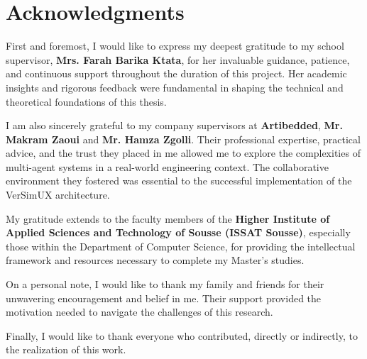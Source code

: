 \chapter*{Acknowledgments}
\thispagestyle{plain}

First and foremost, I would like to express my deepest gratitude to my school supervisor, \textbf{Mrs. Farah Barika Ktata}, for her invaluable guidance, patience, and continuous support throughout the duration of this project. Her academic insights and rigorous feedback were fundamental in shaping the technical and theoretical foundations of this thesis.

I am also sincerely grateful to my company supervisors at \textbf{Artibedded}, \textbf{Mr. Makram Zaoui} and \textbf{Mr. Hamza Zgolli}. Their professional expertise, practical advice, and the trust they placed in me allowed me to explore the complexities of multi-agent systems in a real-world engineering context. The collaborative environment they fostered was essential to the successful implementation of the VerSimUX architecture.

My gratitude extends to the faculty members of the \textbf{Higher Institute of Applied Sciences and Technology of Sousse (ISSAT Sousse)}, especially those within the Department of Computer Science, for providing the intellectual framework and resources necessary to complete my Master's studies.

On a personal note, I would like to thank my family and friends for their unwavering encouragement and belief in me. Their support provided the motivation needed to navigate the challenges of this research.

Finally, I would like to thank everyone who contributed, directly or indirectly, to the realization of this work.
